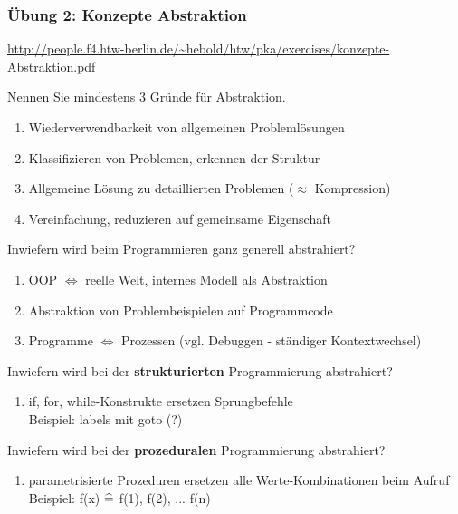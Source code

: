 \begin{card}
	\frametitle{Übung 2: Konzepte Abstraktion}
	\url{http://people.f4.htw-berlin.de/~hebold/htw/pka/exercises/konzepte-Abstraktion.pdf}
\end{card}

\begin{card}
	Nennen Sie mindestens 3 Gründe für Abstraktion.
	\hr
	\begin{enumerate}
	\item Wiederverwendbarkeit von allgemeinen Problemlösungen
	\item Klassifizieren von Problemen, erkennen der Struktur
	\item Allgemeine Lösung zu detaillierten Problemen ($\approx$ Kompression)
	\item Vereinfachung, reduzieren auf gemeinsame Eigenschaft
	\end{enumerate}
\end{card}

\begin{card}
	Inwiefern wird beim Programmieren ganz generell abstrahiert?
	\hr
	\begin{enumerate}
	\item OOP $\Leftrightarrow$ reelle Welt, internes Modell als Abstraktion
	\item Abstraktion von Problembeispielen auf Programmcode
	\item Programme $\Leftrightarrow$ Prozessen (vgl. Debuggen - ständiger Kontextwechsel)
	\end{enumerate}
\end{card}

\begin{card}
	Inwiefern wird bei der \textbf{strukturierten} Programmierung abstrahiert?
	\hr
	\begin{enumerate}
	\item if, for, while-Konstrukte ersetzen Sprungbefehle\\
		Beispiel: labels mit goto (?)
	\end{enumerate}
\end{card}

\begin{card}
	Inwiefern wird bei der \textbf{prozeduralen} Programmierung abstrahiert?
	\hr
	\begin{enumerate}
	\item parametrisierte Prozeduren ersetzen alle Werte-Kombinationen beim Aufruf\\
		Beispiel: f(x) $\mathrel{\widehat{=}}$ f(1), f(2), ... f(n)
	\end{enumerate}
\end{card}

